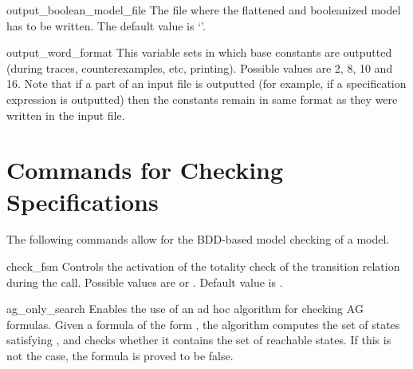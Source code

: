 
\begin{nusmvVar} {output\_boolean\_model\_file}{}{}
The file where the flattened and booleanized model has to be written. The default value is
`'.
\end{nusmvVar}

\begin{nusmvVar}{output\_word\_format}{}{}
This variable sets in which base \Word constants are outputted (during
traces, counterexamples, etc, printing). Possible values are 2, 8, 10
and 16. Note that if a part of an input file is outputted (for
example, if a specification expression is outputted) then the \Word
constants remain in same format as they were written in the input file.
\end{nusmvVar}

\section{Commands for Checking Specifications}
The following commands allow for the BDD-based model checking of a
\nusmv model.





\begin{nusmvVar} {check\_fsm}{}{}
Controls the activation of the totality check of the transition relation
during the \linebreak {} call. Possible values are  or
. Default value is .
\end{nusmvVar}








\begin{nusmvVar} {ag\_only\_search}{}{}
Enables the use of an ad hoc algorithm for checking AG formulas.
Given a formula of the form , the algorithm computes
the set of states satisfying , and checks whether it
contains the set of reachable states. If this is not the case, the
formula is proved to be false.
\end{nusmvVar}

